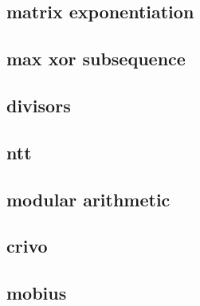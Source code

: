 \subsection{matrix exponentiation}
\raggedbottom
\hrulefill
\subsection{max xor subsequence}
\raggedbottom
\hrulefill
\subsection{divisors}
\raggedbottom
\hrulefill
\subsection{ntt}
\raggedbottom
\hrulefill
\subsection{modular arithmetic}
\raggedbottom
\hrulefill
\subsection{crivo}
\raggedbottom
\hrulefill
\subsection{mobius}
\raggedbottom
\hrulefill

